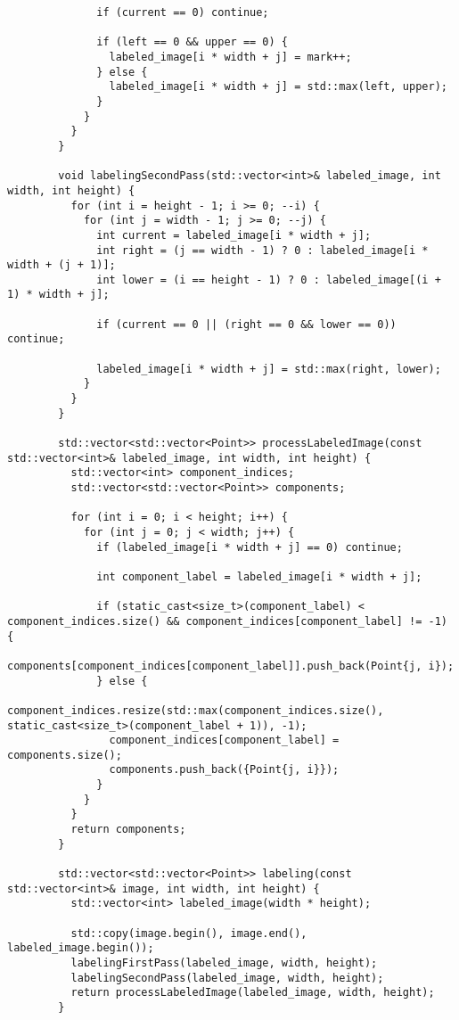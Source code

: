 \documentclass{report}
\begin{document}
\begin{lstlisting}
              if (current == 0) continue;
        
              if (left == 0 && upper == 0) {
                labeled_image[i * width + j] = mark++;
              } else {
                labeled_image[i * width + j] = std::max(left, upper);
              }
            }
          }
        }
        
        void labelingSecondPass(std::vector<int>& labeled_image, int width, int height) {
          for (int i = height - 1; i >= 0; --i) {
            for (int j = width - 1; j >= 0; --j) {
              int current = labeled_image[i * width + j];
              int right = (j == width - 1) ? 0 : labeled_image[i * width + (j + 1)];
              int lower = (i == height - 1) ? 0 : labeled_image[(i + 1) * width + j];
        
              if (current == 0 || (right == 0 && lower == 0)) continue;
        
              labeled_image[i * width + j] = std::max(right, lower);
            }
          }
        }
        
        std::vector<std::vector<Point>> processLabeledImage(const std::vector<int>& labeled_image, int width, int height) {
          std::vector<int> component_indices;
          std::vector<std::vector<Point>> components;
        
          for (int i = 0; i < height; i++) {
            for (int j = 0; j < width; j++) {
              if (labeled_image[i * width + j] == 0) continue;
        
              int component_label = labeled_image[i * width + j];
        
              if (static_cast<size_t>(component_label) < component_indices.size() && component_indices[component_label] != -1) {
                components[component_indices[component_label]].push_back(Point{j, i});
              } else {
                component_indices.resize(std::max(component_indices.size(), static_cast<size_t>(component_label + 1)), -1);
                component_indices[component_label] = components.size();
                components.push_back({Point{j, i}});
              }
            }
          }
          return components;
        }
        
        std::vector<std::vector<Point>> labeling(const std::vector<int>& image, int width, int height) {
          std::vector<int> labeled_image(width * height);
        
          std::copy(image.begin(), image.end(), labeled_image.begin());
          labelingFirstPass(labeled_image, width, height);
          labelingSecondPass(labeled_image, width, height);
          return processLabeledImage(labeled_image, width, height);
        }
        

\end{lstlisting}
\end{document}
